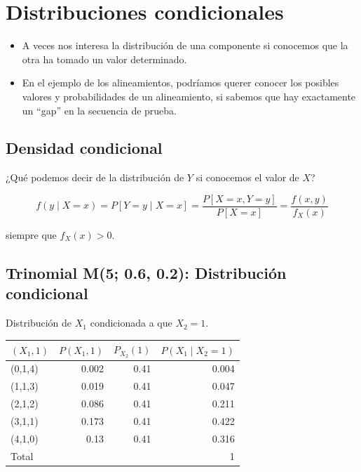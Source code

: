 \documentclass[
  a4paper,
  DIV=11,
  numbers=noendperiod]{scrreprt}
\begin{document}
\section{Distribuciones
condicionales}\label{distribuciones-condicionales}

\begin{itemize}
\item
  A veces nos interesa la distribución de una componente si conocemos
  que la otra ha tomado un valor determinado.
\item
  En el ejemplo de los alineamientos, podríamos querer conocer los
  posibles valores y probabilidades de un alineamiento, si sabemos que
  hay exactamente un ``gap'' en la secuencia de prueba.
\end{itemize}

\subsection{Densidad condicional}\label{densidad-condicional}

¿Qué podemos decir de la distribución de \(Y\) si conocemos el valor de
\(X\)?

\[
f(y \mid X = x) = P[Y = y \mid X = x] = \frac{P[X = x, Y = y]}{P[X = x]} = \frac{f(x, y)}{f_X(x)}
\]

siempre que \(f_X(x) > 0\).

\subsection{Trinomial M(5; 0.6, 0.2): Distribución
condicional}\label{trinomial-m5-0.6-0.2-distribuciuxf3n-condicional}

Distribución de \(X_1\) condicionada a que \(X_2 = 1\).

\begin{longtable}[]{@{}lrrr@{}}
\toprule\noalign{}
\((X_1, 1)\) & \(P(X_1, 1)\) & \(P_{X_2}(1)\) &
\(P(X_1 \mid X_2 = 1)\) \\
\midrule\noalign{}
\endhead
\bottomrule\noalign{}
\endlastfoot
(0,1,4) & 0.002 & 0.41 & 0.004 \\
(1,1,3) & 0.019 & 0.41 & 0.047 \\
(2,1,2) & 0.086 & 0.41 & 0.211 \\
(3,1,1) & 0.173 & 0.41 & 0.422 \\
(4,1,0) & 0.13 & 0.41 & 0.316 \\
Total & & & 1 \\
\end{longtable}
\end{document}

